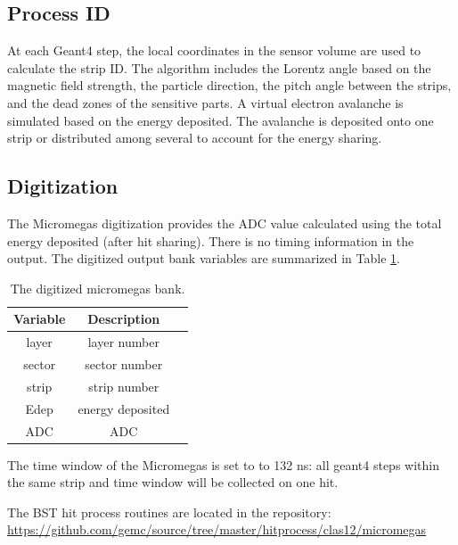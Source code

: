 \subsection{Process ID}
At each Geant4 step, the local coordinates in the sensor volume are used to calculate the strip ID.
The algorithm includes the Lorentz angle based on the magnetic field strength, the particle direction,
the pitch angle between the strips, and the dead zones of the sensitive parts.
A virtual electron avalanche is simulated based on the energy deposited. The avalanche
is deposited onto one strip or distributed among several to account for the energy sharing.



\subsection{Digitization}

The Micromegas digitization provides the ADC value calculated using the total energy deposited (after hit sharing).
There is no timing information in the output.
The digitized output bank variables are summarized in Table \ref{tab:mmBank}.

\begin{table}[h]
	\begin{center}
		\begin{tabular}{| c | c | c |}
			\hline \hline
			Variable         & Description  \\
			\hline
              layer  &                                      layer number   \\
             sector  &                                     sector number   \\
              strip  &                                      strip number   \\
               Edep  &                                  energy deposited   \\
                ADC  &                                               ADC   \\
			\hline \hline
		\end{tabular}
	\end{center}
	\caption{The digitized micromegas bank.}\label{tab:mmBank}
\end{table}

The time window  of the Micromegas is set to to 132 ns: all geant4 steps within the same strip and time window will be collected on one hit.

The BST hit process routines are located in the repository: \url{https://github.com/gemc/source/tree/master/hitprocess/clas12/micromegas}

